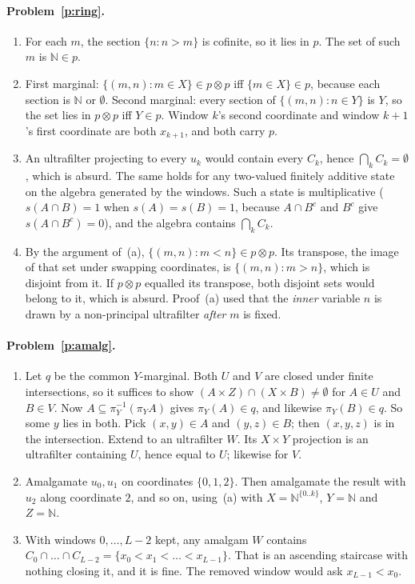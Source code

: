 \documentclass[11pt]{article}
\theoremstyle{definition}
\theoremstyle{remark}
\newcommand{\bbN}{\mathbb{N}}
\begin{document}
\paragraph{Problem~\ref{p:ring}.}
\begin{enumerate}[label=(\alph*)]
  \item For each $m$, the section $\{n:n>m\}$ is cofinite, so it lies in $p$.
    The set of such $m$ is $\bbN\in p$.
  \item First marginal: $\{(m,n):m\in X\}\in p\otimes p$ iff
    $\{m\in X\}\in p$, because each section is $\bbN$ or $\emptyset$. Second
    marginal: every section of $\{(m,n):n\in Y\}$ is $Y$, so the set lies in
    $p\otimes p$ iff $Y\in p$. Window $k$'s second coordinate and window
    $k{+}1$'s first coordinate are both $x_{k+1}$, and both carry $p$.
  \item An ultrafilter projecting to every $u_k$ would contain every $C_k$, hence
    $\bigcap_k C_k=\emptyset$, which is absurd. The same holds for any two-valued
    finitely additive state on the algebra generated by the windows. Such a
    state is multiplicative ($s(A\cap B)=1$ when $s(A)=s(B)=1$, because $A\cap
    B^c$ and $B^c$ give $s(A\cap B^c)=0$), and the algebra contains
    $\bigcap_k C_k$.
  \item By the argument of~(a), $\{(m,n):m<n\}\in p\otimes p$. Its transpose,
    the image of that set under swapping coordinates, is $\{(m,n):m>n\}$, which
    is disjoint from it. If $p\otimes p$ equalled its transpose, both disjoint
    sets would belong to it, which is absurd. Proof~(a) used that the
    \emph{inner} variable $n$ is drawn by a non-principal ultrafilter
    \emph{after} $m$ is fixed.
\end{enumerate}

\paragraph{Problem~\ref{p:amalg}.}
\begin{enumerate}[label=(\alph*)]
  \item Let $q$ be the common $Y$-marginal. Both $U$ and $V$ are closed under
    finite intersections, so it suffices to show
    $(A\times Z)\cap(X\times B)\neq\emptyset$ for $A\in U$ and $B\in V$. Now
    $A\subseteq\pi_Y^{-1}(\pi_Y A)$ gives $\pi_Y(A)\in q$, and likewise
    $\pi_Y(B)\in q$. So some $y$ lies in both. Pick $(x,y)\in A$ and
    $(y,z)\in B$; then $(x,y,z)$ is in the intersection. Extend to an
    ultrafilter $W$. Its $X\times Y$ projection is an ultrafilter containing
    $U$, hence equal to $U$; likewise for $V$.
  \item Amalgamate $u_0,u_1$ on coordinates $\{0,1,2\}$. Then amalgamate the
    result with $u_2$ along coordinate $2$, and so on, using~(a) with
    $X=\bbN^{\{0..k\}}$, $Y=\bbN$ and $Z=\bbN$.
  \item With windows $0,\dots,L{-}2$ kept, any amalgam $W$ contains
    $C_0\cap\dots\cap C_{L-2}=\{x_0<x_1<\dots<x_{L-1}\}$. That is an ascending
    staircase with nothing closing it, and it is fine. The removed window would
    ask $x_{L-1}<x_0$.
\end{enumerate}
\end{document}
